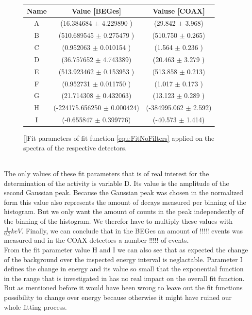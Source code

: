 \documentclass[encoding=utf8,british]{tumphthesis}
\begin{document}
\begin{figure}[t!]
\centering
\begin{tabular}{|c|c|c|}
\hline
Name	& Value [BEGes] & Valuse [COAX]\\ 
\hline
A  &	(16.384684 \(\pm\)	4.229890	)&	(29.842 \(\pm\)	3.968)	\\	
\hline
B  &	(510.689545  \(\pm\)	0.275479	)&	(510.750 \(\pm\)	0.265)\\	
\hline
C  &	(0.952063 \(\pm\)	0.010154	)	&	(1.564 \(\pm\)	0.236	)	\\
\hline
D  &	(36.757652 \(\pm\)	4.743389)	&	(20.463 \(\pm\)	3.279	)	\\
\hline
E  &	(513.923462 \(\pm\)	0.153953	)	&	(513.858 \(\pm\)	0.213)	\\
\hline
F  &	(0.952731 \(\pm\)	0.011750	)	&	(1.017 \(\pm\)	0.173	)	\\
\hline
G  &	(21.714308 \(\pm\)	0.432063)	&	(13.123 \(\pm\)	0.289	)	\\
\hline
H  &	(-224175.656250 \(\pm\)	0.000424)	&	(-384995.062 \(\pm\)	2.592)	\\
\hline
I  &	(-0.655847 \(\pm\) 0.399776)	&	(-40.573 \(\pm\)	1.414)\\
\hline

\end{tabular}
\label{tab:FitParNoFilter}
[]{Fit parameters of fit function \ref{equ:FitNoFilters} applied on the spectra of the respective detectors.}
\end{figure}
\\



The only values of these fit parameters that is of real interest for the determination of the activity is variable D.
Its value is the amplitude of the second Gaussian peak.
Because the Gaussian peak was chosen in the normalized form this value also represents the amount of \Kr decays measured per binning of the histogram.
But we only want the amount of counts in the peak independently of the binning of the histogram.
We therefor have to multiply these values with $\frac{1}{0.2}\unit{keV}$.
Finally, we can conclude that in the BEGes an amount of !!!!! events was measured and in the COAX detectors a number !!!!! of events.
\\


From the fit parameter value H and I we can also see that as expected the change of the background over the inspected energy interval is neglactable.
Parameter I defines the change in energy and its value so small that the exponential function in the range that is investigated in has no real impact on the overall fit function.
But as mentioned before it would have been wrong to leave out the fit functions possibility to change over energy because otherwise it might have ruined our whole fitting process. 
\\
\end{document}
